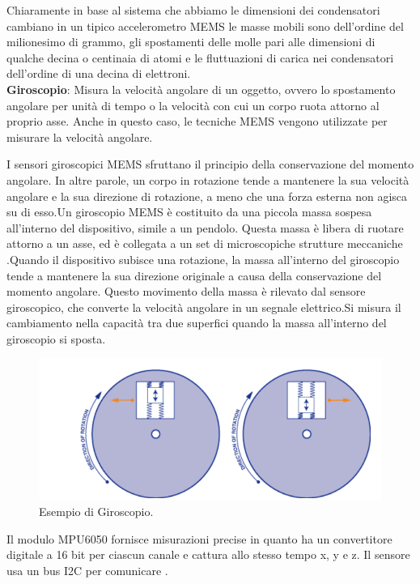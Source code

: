 \documentclass{article}
\begin{document}
Chiaramente in base al sistema che abbiamo le dimensioni dei condensatori cambiano in un tipico
accelerometro MEMS le masse mobili sono dell’ordine del milionesimo di grammo, gli spostamenti
delle molle pari alle dimensioni di qualche decina o centinaia di atomi e le fluttuazioni di carica nei
condensatori dell’ordine di una decina di elettroni.\\

\textbf{Giroscopio}: Misura la velocità angolare di un oggetto, ovvero lo spostamento angolare per unità di tempo o la velocità con cui un corpo ruota attorno al proprio asse. Anche in questo caso, le tecniche MEMS vengono utilizzate per misurare la velocità angolare.

 I sensori giroscopici MEMS sfruttano il principio della conservazione del momento angolare. In altre parole, un corpo in rotazione tende a mantenere la sua velocità angolare e la sua direzione di rotazione, a meno che una forza esterna non agisca su di esso.Un giroscopio MEMS è costituito da una piccola massa sospesa all'interno del dispositivo, simile a un pendolo. Questa massa è libera di ruotare attorno a un asse, ed è collegata a un set di microscopiche strutture meccaniche .Quando il dispositivo subisce una rotazione, la massa all'interno del giroscopio tende a mantenere la sua direzione originale a causa della conservazione del momento angolare. Questo movimento della massa è rilevato dal sensore giroscopico, che converte la velocità angolare in un segnale elettrico.Si misura il cambiamento nella capacità tra due superfici quando la massa all'interno del giroscopio si sposta.
 \begin{figure}[H]
\centering
\includegraphics[width=0.82\linewidth]{image/giro.png}
\caption{\label{gito:pot} Esempio di Giroscopio.}
\end{figure}

Il modulo MPU6050 fornisce misurazioni precise in quanto ha un convertitore digitale a 16 bit per ciascun canale e cattura allo stesso tempo x, y e z. Il sensore usa un bus I2C per comunicare .
\end{document}
